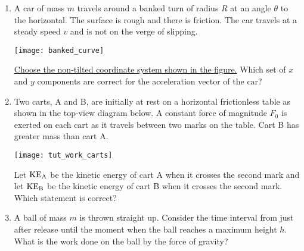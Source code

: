 \documentclass[11pt]{article}
\begin{document}
\begin{enumerate}
\item A car of mass $m$ travels around a banked turn of radius $R$ at an angle $\theta$ to the horizontal. The surface is rough and there is friction. The car travels at a steady speed $v$ and is not on the verge of slipping.
\begin{center}
\texttt{[image: banked\_curve]}
\end{center}
\uline{Choose the non-tilted coordinate system shown in the figure.} Which set of $x$ and $y$ components are correct for the acceleration vector of the car?

\newpage

\item Two carts, A and B, are initially at rest on a horizontal frictionless table as shown in the top-view diagram below. A constant force of magnitude $F_0$ is exerted on each cart as it travels between two marks on the table. Cart B has greater mass than cart A.
\begin{center}
\texttt{[image: tut\_work\_carts]}
\end{center}
Let ${\rm KE}_{\rm A}$ be the kinetic energy of cart A when it crosses the second mark and let ${\rm KE}_{\rm B}$ be the kinetic energy of cart B when it crosses the second mark. Which statement is correct?

\item A ball of mass $m$ is thrown straight up. Consider the time interval from just after release until the moment when the ball reaches a maximum height $h$. What is the work done on the ball by the force of gravity?


\end{enumerate}
\end{document}
